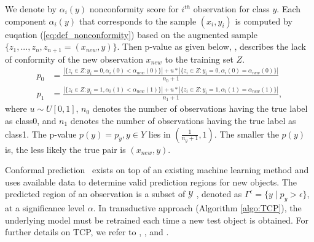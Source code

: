 \documentclass[main]{subfiles}
\begin{document}
We denote by $\alpha_i(y)$ nonconformity score for $i^{th}$ observation for class $y$. Each component  $\alpha_i(y)$ that corresponds to the sample $(x_i,y_i)$ is computed by
euqation (\ref{eq:def_nonconformity}) based on the augmented sample  $\{ z_1 , ..., z_n, z_{n+1}=(x_{new},y) \}$. Then p-value as given below, \cite{vovk2005algorithmic},  describes the lack of conformity of the  new observation $x_{new}$ to the training set $Z$. 
 \begin{align*}
 p_0 &= \frac{| \{ z_i \in Z : y_i=0, \alpha_i(0) < \alpha_{new}(0) \} | + u* | \{ z_i \in Z : y_i=0, \alpha_i(0) = \alpha_{new}(0)\} |}{n_0+1} \\
 p_1 &= \frac{| \{ z_i \in Z :  y_i=1, \alpha_i(1) < \alpha_{new}(1) \}  |+u*|  \{ z_i \in Z :  y_i=1, \alpha_i(1) =\alpha_{new}(1) \} |}{n_1+1} ,
 \end{align*}
 where $u \sim U[0,1]$, $n_0$ denotes the number of observations having the true label as class0, and $n_1$ denotes the number of observations having the true label as class1.
The p-value $p(y)=p_y, y \in Y$ lies in $ \left( \frac{1}{n_y+1},1 \right)$. The smaller the $p(y)$
 is, the less likely the true pair is $(x_{new},y)$.

 
Conformal prediction~\citep{vovk2005algorithmic} exists on top of an existing machine learning method and uses available data to determine valid prediction regions for new objects. 
The predicted region of an observation is a subset of $\mathcal{Y}$ , denoted as $\Gamma^{\epsilon} = \{ y \mid p_y > \epsilon \}$, at a significance level $\alpha$. In transductive approach (Algorithm \ref{algo:TCP}), the underlying model must be retrained each time a new test object is obtained. For further details on TCP, we refer to \cite{vapnik1998statistical}, \cite{shafer2008tutorial}, \cite{vovk2005algorithmic} and \cite{balasubramanian2014conformal}. 
\end{document}

